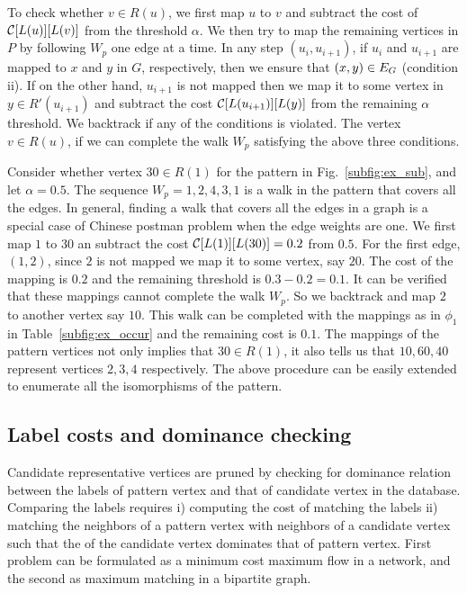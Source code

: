 To check whether $v \in R(u)$, we first map $u$ to $v$ and subtract the
cost of ${\mathcal{C}}[L(u)][L(v)]$ from the threshold $\alpha$. We then
try to map the remaining vertices in $P$ by following $W_p$ one edge at
a time. In any step $(u_i, u_{i+1})$, if $u_i$ and $u_{i+1}$ are mapped
to $x$ and $y$ in $G$, respectively, then we ensure that $(x, y) \in E_G$
(condition ii). If on the other hand, $u_{i+1}$ is not mapped then we
map it to some vertex in $y \in R'(u_{i+1})$ and subtract the cost
${\mathcal{C}}[L(u_{i+1})][L(y)]$ from the remaining $\alpha$ threshold.
We backtrack if any of the conditions is violated. The vertex $v
\in R(u)$, if we can complete the walk $W_p$ satisfying the above three
conditions.

Consider whether vertex $30 \in R(1)$ for the pattern in
Fig.~\ref{subfig:ex_sub}, and let $\alpha = 0.5$. The sequence $W_p =
1, 2, 4, 3, 1$ is a walk in the pattern that covers all the edges.  In
general, finding a walk that covers all the edges in a graph is a
special case of Chinese postman problem \cite{chinesepostman}  when the edge
weights are one. We first
map $1$ to $30$ an subtract the cost ${\mathcal{C}}[L(1)][L(30)] = 0.2$
from $0.5$. For the first edge, $(1,2)$, since $2$ is not mapped we map it
to some vertex, say $20$. The cost of the mapping is $0.2$ and the
remaining threshold is $0.3 -0.2 = 0.1$. It can be verified that these
mappings cannot complete the walk $W_p$. So we backtrack and map $2$ to
another vertex say $10$. This walk can be completed with the mappings as
in $\phi_1$ in Table~\ref{subfig:ex_occur} and the remaining cost is
$0.1$. The mappings of the pattern vertices not only implies that $30
\in R(1)$, it also tells us that $10, 60, 40$ represent vertices $2, 3,
4$ respectively.  The above procedure can be easily extended to
enumerate all the isomorphisms of the pattern.

\subsection{Label costs and dominance checking} \label{sec:labelcheck}
Candidate representative vertices are pruned by checking for dominance
relation between the \ncl labels of pattern vertex and that of candidate
vertex in the database. Comparing the \ncl labels requires i) computing
the cost of matching the \khop labels ii) matching the neighbors of
a pattern vertex with neighbors of a candidate vertex such that the \ncl of the 
candidate vertex dominates that of pattern vertex. First problem can
be formulated as a minimum cost maximum flow in a network, and the second
as maximum matching in a bipartite graph.

